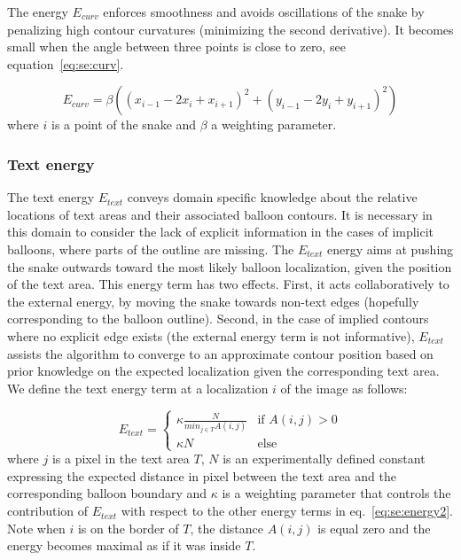 The energy $E_{curv}$ enforces smoothness and avoids oscillations of the snake by penalizing high contour curvatures (minimizing the second derivative).
It becomes small when the angle between three points is close to zero, see equation~\ref{eq:se:curv}.

\begin{equation}\label{eq:se:curv}
  E_{curv} = \beta \left( (x_{i-1} - 2x_{i} + x_{i+1})^2 + (y_{i-1} - 2y_{i} + y_{i+1})^2 \right)
\end{equation}
where $i$ is a point of the snake and $\beta$ a weighting parameter.


\subsubsection{Text energy}
\label{sec:se:text_energie}

The text energy $E_{text}$ conveys domain specific knowledge about the relative locations of text areas and their associated balloon contours.
It is necessary in this domain to consider the lack of explicit information in the cases of implicit balloons, where parts of the outline are missing.
The $E_{text}$ energy aims at pushing the snake outwards toward the most likely balloon localization, given the position of the text area.
This energy term has two effects.
First, it acts collaboratively to the external energy, by moving the snake towards non-text edges (hopefully corresponding to the balloon outline).
Second, in the case of implied contours where no explicit edge exists (the external energy term is not informative), $E_{text}$ assists the algorithm to converge to an approximate contour position based on prior knowledge on the expected localization given the corresponding text area.
We define the text energy term at a localization $i$ of the image as follows:

\begin{equation}\label{eq:se:know}
E_{text} = \begin{cases} \kappa \frac{N}{min_{j \in T} A(i,j)} & \mbox{if } A(i,j) > 0 \\ \kappa N & \mbox{else} \end{cases}
\end{equation}
where $j$ is a pixel in the text area $T$, $N$ is an experimentally defined constant expressing the expected distance in pixel between the text area and the corresponding balloon boundary and $\kappa$ is a weighting parameter that controls the contribution of $E_{text}$ with respect to the other energy terms in eq.~\ref{eq:se:energy2}. Note when $i$ is on the border of $T$, the distance $A(i,j)$ is equal zero and the energy becomes maximal as if it was inside $T$.


